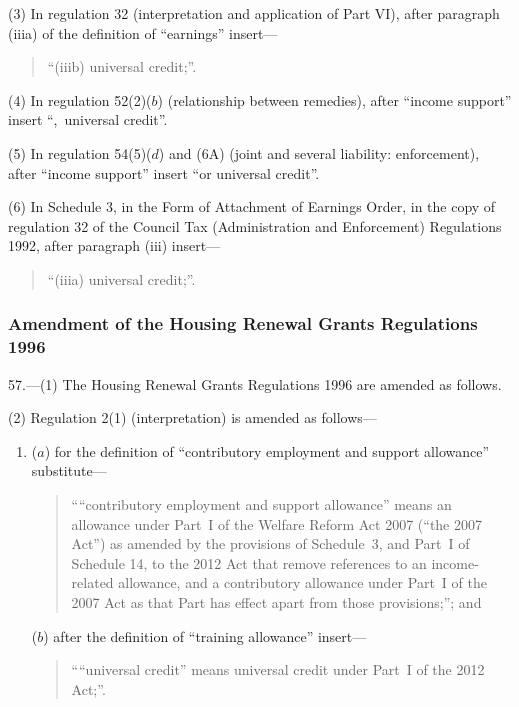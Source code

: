 \documentclass[12pt,a4paper]{article}
\begin{document}
(3) In regulation 32 (interpretation and application of Part VI), after paragraph (iiia) of the definition of “earnings” insert—
\begin{quotation}
“(iiib) universal credit;”.
\end{quotation}

(4) In regulation 52(2)($b$)  (relationship between remedies), after “income support” insert “,~universal credit”.

(5) In regulation 54(5)($d$)  and (6A) (joint and several liability: enforcement), after “income support” insert “or universal credit”.

(6) In Schedule 3, in the Form of Attachment of Earnings Order, in the copy of regulation 32 of the Council Tax (Administration and Enforcement) Regulations 1992, after paragraph (iii)  insert—
\begin{quotation}
“(iiia) universal credit;”.
\end{quotation}

\subsubsection[57. Amendment of the Housing Renewal Grants Regulations 1996]{Amendment of the Housing Renewal Grants Regulations 1996}

57.—(1) The Housing Renewal Grants Regulations 1996 are amended as follows.

(2) Regulation 2(1) (interpretation) is amended as follows—
\begin{enumerate}\item[]
($a$) for the definition of ``contributory employment and support allowance'' substitute—
\begin{quotation}
““contributory employment and support allowance” means an allowance under Part~I of the Welfare Reform Act 2007 (“the 2007 Act”) as amended by the provisions of Schedule~3, and Part~I of Schedule 14, to the 2012 Act that remove references to an income-related allowance, and a contributory allowance under Part~I of the 2007 Act as that Part has effect apart from those provisions;”; and
\end{quotation}

($b$) after the definition of “training allowance” insert—
\begin{quotation}
““universal credit” means universal credit under Part~I of the 2012 Act;”.
\end{quotation}
\end{enumerate}
\end{document}

